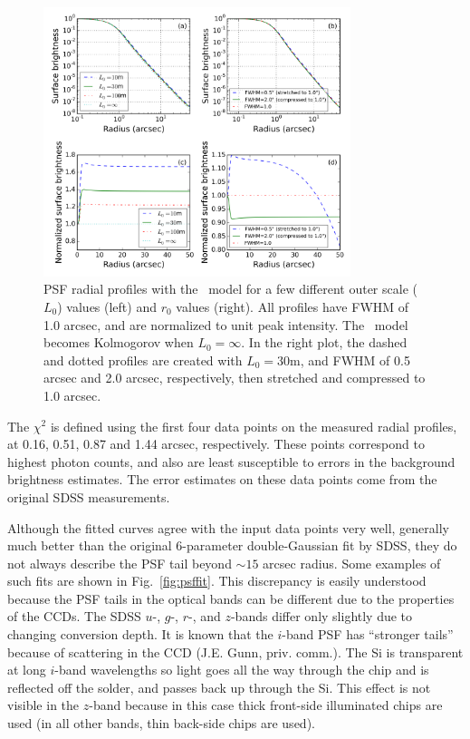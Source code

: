 \begin{figure}[ht]
\centering
\includegraphics[width=0.8\textwidth]{FIGURES/vonK.png}
\vskip -0.2in 
\caption{PSF radial profiles with the \vk~model for a few different
  outer scale ($L_0$) values (left) and $r_0$ values (right). 
All profiles have FWHM of 1.0 arcsec, and
  are normalized to unit peak intensity. The \vk~model becomes
  Kolmogorov when $L_0 = \infty$.
In the right plot, the dashed and dotted profiles are created with
$L_0 = 30$m, and 
FWHM of 0.5 arcsec and 2.0 arcsec, respectively, then stretched and compressed to 1.0 arcsec.
\label{fig:vonK}}
\end{figure}

The $\chi^2$ is defined using the first four data points on the
measured radial profiles, at 0.16, 0.51, 0.87 and 1.44 arcsec,
respectively. These points correspond to highest photon counts, and 
also are least susceptible to errors in the background brightness
estimates. 
The error estimates on these data points come from the original SDSS measurements.

Although the fitted
curves agree with the input data points very well, generally much better than the
original 6-parameter double-Gaussian fit by SDSS, they do not always describe
the PSF tail beyond $\sim 15$ arcsec radius. 
Some examples of such fits are shown in Fig.~\ref{fig:psffit}.
This discrepancy is easily understood
because the PSF tails in the optical bands can be 
different due to the properties of the CCDs.
The SDSS $u$-, $g$-, $r$-, and $z$-bands differ only slightly due to
changing conversion depth. It is known that the $i$-band PSF has ``stronger tails''
because of scattering in the CCD (J.E. Gunn, priv. comm.). The Si is transparent at long $i$-band wavelengths 
so light goes all the way through the chip and is reflected off the solder, and passes 
back up through the Si. This effect is not visible in the $z$-band because in this case
thick front-side illuminated chips are used (in all other bands, thin back-side chips are used). 



